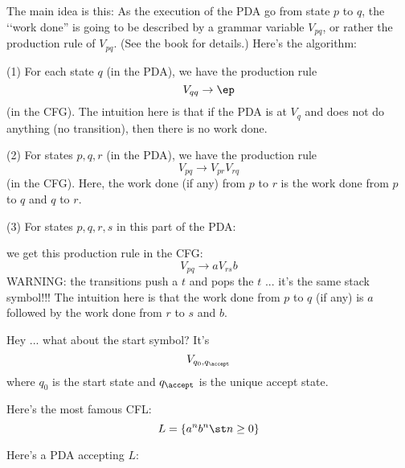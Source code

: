 The main idea is this:
As the execution of the PDA go from state $p$ to $q$, 
the \lq\lq work done'' is going to be 
described by a grammar variable $V_{pq}$, or rather
the production rule of $V_{pq}$.
(See the book for details.)
Here's the algorithm:
\begin{mylist}
\item[(1)] For each state $q$ (in the PDA), we have the production rule
\[
V_{qq} \rightarrow \ep
\]
(in the CFG).
The intuition here is that if the PDA is at $V_{q}$ and does not
do anything (no transition), then there is no work done. 
\item[(2)] For states $p, q, r$ (in the PDA), we have the production rule
\[
V_{pq} \rightarrow V_{pr} V_{rq}
\]
(in the CFG).
Here, the work done (if any) from $p$ to $r$ is the
work done from $p$ to $q$ and $q$ to $r$.
\item[(3)] For states $p, q, r, s$ in this part of the PDA:

\begin{center}
\end{center}
we get this production rule in the CFG:
\[
V_{pq} \rightarrow a V_{rs} b
\]  
WARNING: the transitions push a $t$ and pops the $t$ ... it's the same
stack symbol!!!
The intuition here is that the work done from $p$ to $q$ (if any)
is $a$ followed by the work done from $r$ to $s$ and $b$.
\end{mylist}
Hey ... what about the start symbol?
It's
\[
V_{q_0, q_\accept}
\]
where $q_0$ is the start state and $q_\accept$ is the unique accept state.

\begin{eg}
Here's the most famous CFL:
\[
L = \{ a^n b^n \st n \geq 0 \}
\]
\end{eg}
Here's a PDA accepting $L$:
\begin{center}
\end{center}


